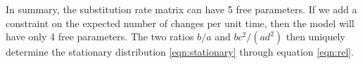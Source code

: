 \documentclass[11pt]{article}
\begin{document}
In summary, the substitution rate matrix can have 5 free
parameters. If we add a constraint on the expected number of changes
per unit time, then the model will have only 4 free parameters. The
two ratios $b/a$ and $bc^2/(ad^2)$ then uniquely
determine the stationary distribution \eqref{eqn:stationary} through
equation \eqref{eqn:rel}.


\end{document}
